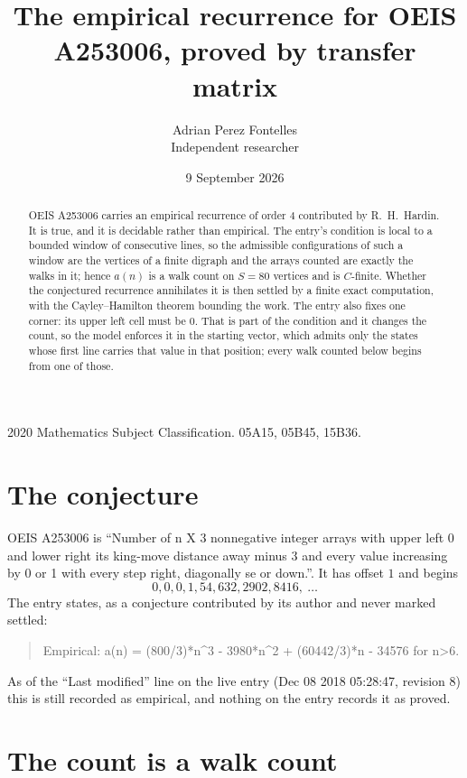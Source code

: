 \documentclass[11pt,a4paper]{article}
\title{The empirical recurrence for OEIS A253006, proved by transfer matrix}
\author{Adrian Perez Fontelles\\ \small Independent researcher}
\date{9 September 2026}
\theoremstyle{plain}
\theoremstyle{definition}
\begin{document}
\maketitle

\begin{abstract}
OEIS A253006 carries an empirical recurrence of order $4$ contributed by R.~H.~Hardin. It is
true, and it is decidable rather than empirical. The entry's condition is local to a bounded window of consecutive lines, so
the admissible configurations of such a window are the vertices of a finite digraph and the
arrays counted are exactly the walks in it; hence $a(n)$ is a walk count on $S=80$ vertices
and is $C$-finite. Whether the conjectured recurrence annihilates it is then settled by a
finite exact computation, with the Cayley--Hamilton theorem bounding the work.
 The entry also fixes one corner: its upper left cell must be $0$. That is part of the condition and it changes the count, so the model enforces it in the starting vector, which admits only the states whose first line carries that value in that position; every walk counted below begins from one of those.\end{abstract}

\noindent\small 2020 Mathematics Subject Classification. 05A15, 05B45, 15B36.\normalsize

\section{The conjecture}

OEIS A253006 is ``Number of n X 3 nonnegative integer arrays with upper left 0 and lower right its king-move distance away minus 3 and every value increasing by 0 or 1 with every step right, diagonally se or down.''. It has offset $1$ and begins
\[
0, 0, 0, 1, 54, 632, 2902, 8416,\ \dots
\]
The entry states, as a conjecture contributed by its author and never marked settled:
\begin{quote}
Empirical: a(n) = (800/3)*n\^{}3 - 3980*n\^{}2 + (60442/3)*n - 34576 for n>6.
\end{quote}
As of the ``Last modified'' line on the live entry (Dec 08 2018 05:28:47, revision 8) this is still
recorded as empirical, and nothing on the entry records it as proved.

\section{The count is a walk count}
\end{document}
